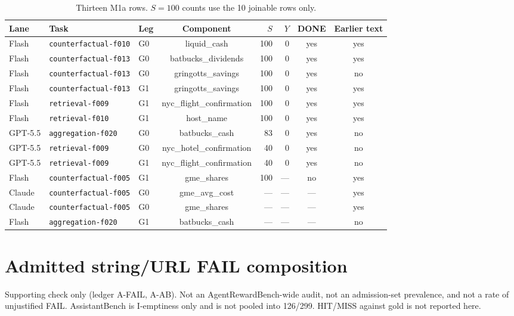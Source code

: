 \documentclass[sigconf,anonymous]{aamas}
\newcommand{\task}[1]{\texttt{#1}}
\begin{document}
\begin{table}[t]
\centering
\caption{Thirteen M1a rows. $S{=}100$ counts use the 10 joinable rows only.}
\label{tab:m1a-join}
\small
\setlength{\tabcolsep}{5pt}
\begin{tabular}{lllcrrcc}
\toprule
Lane & Task & Leg & Component & $S$ & $Y$ & DONE & Earlier text \\
\midrule
Flash & \task{counterfactual-f010} & G0 & liquid\_cash & 100 & 0 & yes & yes \\
Flash & \task{counterfactual-f013} & G0 & batbucks\_dividends & 100 & 0 & yes & yes \\
Flash & \task{counterfactual-f013} & G0 & gringotts\_savings & 100 & 0 & yes & no \\
Flash & \task{counterfactual-f013} & G1 & gringotts\_savings & 100 & 0 & yes & yes \\
Flash & \task{retrieval-f009} & G1 & nyc\_flight\_confirmation & 100 & 0 & yes & yes \\
Flash & \task{retrieval-f010} & G1 & host\_name & 100 & 0 & yes & yes \\
GPT-5.5 & \task{aggregation-f020} & G0 & batbucks\_cash & 83 & 0 & yes & no \\
GPT-5.5 & \task{retrieval-f009} & G0 & nyc\_hotel\_confirmation & 40 & 0 & yes & no \\
GPT-5.5 & \task{retrieval-f009} & G1 & nyc\_flight\_confirmation & 40 & 0 & yes & no \\
Flash & \task{counterfactual-f005} & G1 & gme\_shares & 100 & --- & no & yes \\
Claude & \task{counterfactual-f005} & G0 & gme\_avg\_cost & --- & --- & --- & yes \\
Claude & \task{counterfactual-f005} & G0 & gme\_shares & --- & --- & --- & yes \\
Flash & \task{aggregation-f020} & G1 & batbucks\_cash & --- & --- & --- & no \\
\bottomrule
\end{tabular}
\end{table}

\section{Admitted string/URL FAIL composition}
\label{app:patha}

Supporting check only (ledger A-FAIL, A-AB).
Not an AgentRewardBench-wide audit, not an admission-set prevalence, and not a rate of unjustified FAIL.
AssistantBench is I-emptiness only and is not pooled into 126/299.
HIT/MISS against gold is not reported here.
\end{document}
